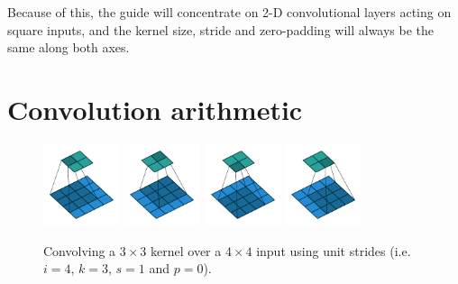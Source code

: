\documentclass{article}
\begin{document}
Because of this, the guide will concentrate on 2-D convolutional layers acting
on square inputs, and the kernel size, stride and zero-padding will always be
the same along both axes.

\section{Convolution arithmetic}

\begin{figure}[t]
    \centering
    \includegraphics[width=0.2\textwidth]{pdf/no_padding_no_strides_00.pdf}
    \includegraphics[width=0.2\textwidth]{pdf/no_padding_no_strides_01.pdf}
    \includegraphics[width=0.2\textwidth]{pdf/no_padding_no_strides_02.pdf}
    \includegraphics[width=0.2\textwidth]{pdf/no_padding_no_strides_03.pdf}
    \caption{\label{fig:no_padding_no_strides} Convolving a $3 \times 3$ kernel
        over a $4 \times 4$ input using unit strides (i.e. $i = 4$, $k = 3$,
        $s = 1$ and $p = 0$).}
\end{figure}
\end{document}
